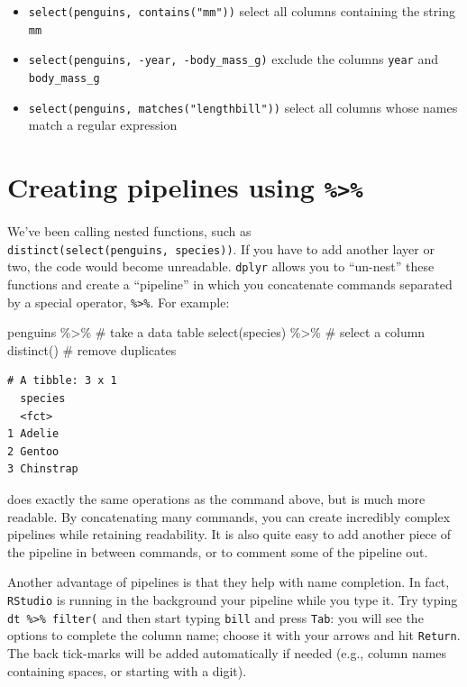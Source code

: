 \documentclass[
  letterpaper,
  DIV=11,
  numbers=noendperiod]{scrreprt}
\newenvironment{Shaded}{\begin{snugshade}}{\end{snugshade}}
\newcommand{\CommentTok}[1]{\textcolor[rgb]{0.37,0.37,0.37}{#1}}
\newcommand{\FunctionTok}[1]{\textcolor[rgb]{0.28,0.35,0.67}{#1}}
\newcommand{\NormalTok}[1]{\textcolor[rgb]{0.00,0.23,0.31}{#1}}
\newcommand{\SpecialCharTok}[1]{\textcolor[rgb]{0.37,0.37,0.37}{#1}}
\providecommand{\tightlist}{%
  \setlength{\itemsep}{0pt}\setlength{\parskip}{0pt}}\usepackage{longtable,booktabs,array}
\begin{document}
\begin{itemize}
\tightlist
\item
  \texttt{select(penguins,\ contains("mm"))} select all columns
  containing the string \texttt{mm}
\item
  \texttt{select(penguins,\ -year,\ -body\_mass\_g)} exclude the columns
  \texttt{year} and \texttt{body\_mass\_g}
\item
  \texttt{select(penguins,\ matches("length\textbar{}bill"))} select all
  columns whose names match a regular expression
\end{itemize}

\hypertarget{creating-pipelines-using}{%
\section{\texorpdfstring{Creating pipelines using
\texttt{\%\textgreater{}\%}}{Creating pipelines using \%\textgreater\%}}\label{creating-pipelines-using}}

We've been calling nested functions, such as
\texttt{distinct(select(penguins,\ species))}. If you have to add
another layer or two, the code would become unreadable. \texttt{dplyr}
allows you to ``un-nest'' these functions and create a ``pipeline'' in
which you concatenate commands separated by a special operator,
\texttt{\%\textgreater{}\%}. For example:

\begin{Shaded}
\begin{Highlighting}[]
\NormalTok{penguins }\SpecialCharTok{\%\textgreater{}\%} \CommentTok{\# take a data table}
  \FunctionTok{select}\NormalTok{(species) }\SpecialCharTok{\%\textgreater{}\%} \CommentTok{\# select a column}
  \FunctionTok{distinct}\NormalTok{() }\CommentTok{\# remove duplicates}
\end{Highlighting}
\end{Shaded}

\begin{verbatim}
# A tibble: 3 x 1
  species  
  <fct>    
1 Adelie   
2 Gentoo   
3 Chinstrap
\end{verbatim}

does exactly the same operations as the command above, but is much more
readable. By concatenating many commands, you can create incredibly
complex pipelines while retaining readability. It is also quite easy to
add another piece of the pipeline in between commands, or to comment
some of the pipeline out.

Another advantage of pipelines is that they help with name completion.
In fact, \texttt{RStudio} is running in the background your pipeline
while you type it. Try typing \texttt{dt\ \%\textgreater{}\%\ filter(}
and then start typing \texttt{bill} and press \texttt{Tab}: you will see
the options to complete the column name; choose it with your arrows and
hit \texttt{Return}. The back tick-marks will be added automatically if
needed (e.g., column names containing spaces, or starting with a digit).
\end{document}
